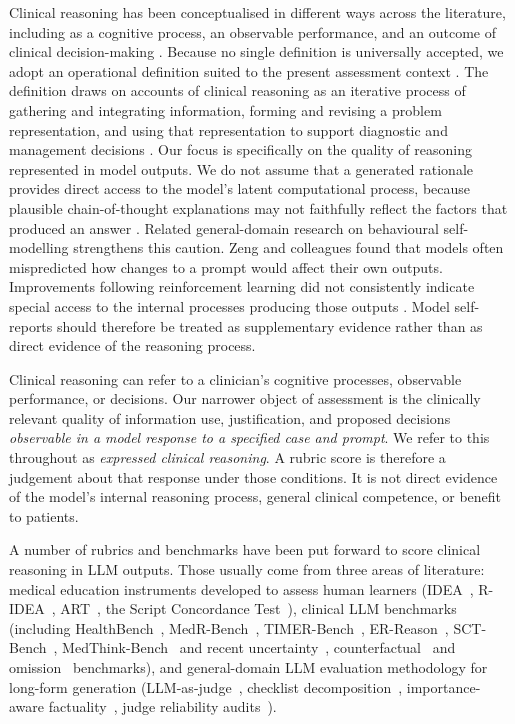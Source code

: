 \documentclass{article}
\begin{document}
Clinical reasoning has been conceptualised in different ways across the
literature, including as a cognitive process, an observable performance, and
an outcome of clinical decision-making
\cite{gruppen2017,young2018,thampy2019}. Because no single definition is
universally accepted, we adopt an operational definition suited to the
present assessment context \cite{gruppen2017,young2018}. The definition draws
on accounts of clinical reasoning as an iterative process of gathering and
integrating information, forming and revising a problem representation, and
using that representation to support diagnostic and management decisions
\cite{gruppen2017,thampy2019}. Our focus is specifically on the quality of reasoning represented in model outputs. We do not assume that a generated rationale provides direct access to the model's latent computational process, because plausible chain-of-thought explanations may not faithfully reflect the factors that produced an answer \cite{jacovi2020,turpin2023}. Related general-domain research on behavioural self-modelling strengthens this caution. Zeng and colleagues found that models often mispredicted how changes to a prompt would affect their own outputs. Improvements following reinforcement learning did not consistently indicate special access to the internal processes producing those outputs \cite{zeng2026}. Model self-reports should therefore be treated as supplementary evidence rather than as direct evidence of the reasoning process.

Clinical reasoning can refer to a clinician's cognitive processes,
observable performance, or decisions. Our narrower object of assessment
is the clinically relevant quality of information use, justification,
and proposed decisions \emph{observable in a model response to a specified
case and prompt}. We refer to this throughout as \emph{expressed clinical
reasoning}. A rubric score is therefore a judgement about that response
under those conditions. It is not direct evidence of the model's internal
reasoning process, general clinical competence, or benefit to patients.

A number of rubrics and benchmarks have been put forward to score clinical
reasoning in LLM outputs. Those usually come from three areas of literature:
medical education instruments developed to assess human learners
(IDEA~\cite{baker2015}, R-IDEA~\cite{schaye2022}, ART~\cite{thammasitboon2018art},
the Script Concordance Test~\cite{lubarsky2013}), clinical LLM benchmarks
(including HealthBench~\cite{arora2025healthbench}, MedR-Bench~\cite{qiu2025medrbench},
TIMER-Bench~\cite{cui2025timer}, ER-Reason~\cite{mehandru2025},
SCT-Bench~\cite{mccoy2025}, MedThink-Bench~\cite{zhou2026medthinkbench} and recent
uncertainty~\cite{du2026,meincke2026}, counterfactual~\cite{adewuyi2026} and
omission~\cite{oukelmoun2025} benchmarks), and general-domain LLM evaluation
methodology for long-form generation (LLM-as-judge~\cite{liu2023,zheng2023},
checklist decomposition~\cite{kim2024,ye2024,lee2025survey}, importance-aware
factuality~\cite{min2023,song2024,wei2024,jafari2026,wanner2025,chen2026},
judge reliability audits~\cite{reliability2026}).
\end{document}
